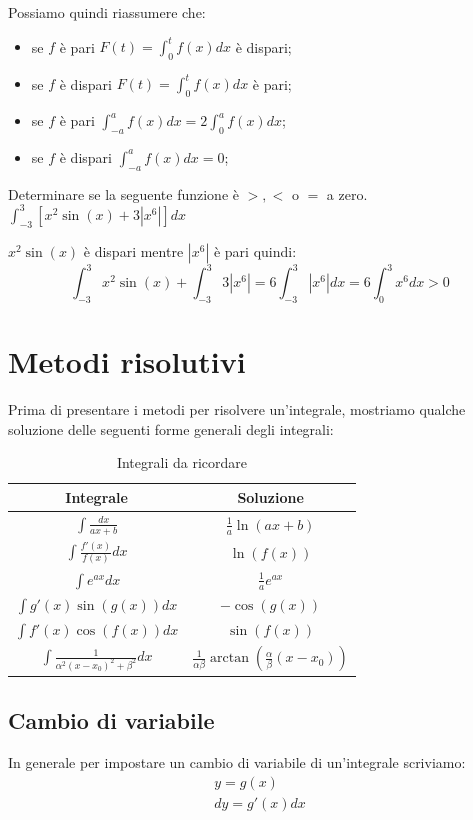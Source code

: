 Possiamo quindi riassumere che:
\begin{itemize}
    \item se $f$ è pari $F(t)=\int^t_0f(x)dx$ è dispari;
    \item se $f$ è dispari $F(t)=\int^t_0f(x)dx$ è pari;
    \item se $f$ è pari $\int^a_{-a}f(x)dx=2\int^a_0f(x)dx$;
    \item se $f$ è dispari $\int^a_{-a}f(x)dx=0$;
\end{itemize}

\begin{example}
    Determinare se la seguente funzione è $>, <$ o $=$ a zero. $\int^3_{-3}[x^2\sin(x)+3|x^6|]dx$
    
    $x^2\sin(x)$ è dispari mentre $|x^6|$ è pari quindi:
    \begin{equation*}
        \int^3_{-3}x^2\sin(x)+\int^3_{-3}3|x^6| = 6\int^3_{-3}|x^6|dx = 6\int^3_0x^6dx > 0
    \end{equation*}
\end{example}




\chapter{Metodi risolutivi}
Prima di presentare i metodi per risolvere un'integrale, mostriamo qualche soluzione delle seguenti forme generali degli integrali:
\begin{table}[H]
    \centering
    \begin{tabular}{|c|c|}
         \hline Integrale & Soluzione\\\hline\hline
         $\int\frac{dx}{ax+b}$ & $\frac{1}{a}\ln(ax+b)$\\\hline
         $\int\frac{f'(x)}{f(x)}dx$ & $\ln(f(x))$\\\hline
         $\int e^{ax}dx$ & $\frac{1}{a}e^{ax}$\\\hline
         $\int g'(x)\sin(g(x))dx$ & $-\cos(g(x))$\\\hline
         $\int f'(x)\cos(f(x))dx$ & $\sin(f(x))$\\\hline
         $\int \frac{1}{\alpha^2(x-x_0)^2+\beta^2} dx$ & $\frac{1}{\alpha\beta}\arctan(\frac{\alpha}{\beta}(x-x_0))$\\\hline
    \end{tabular}
    \caption{Integrali da ricordare}
    \label{tab:integraliDaRicordare}
\end{table}
\section{Cambio di variabile}
In generale per impostare un cambio di variabile di un'integrale scriviamo:
\begin{align*}
    y=g(x)\\dy=g'(x)dx
\end{align*}

